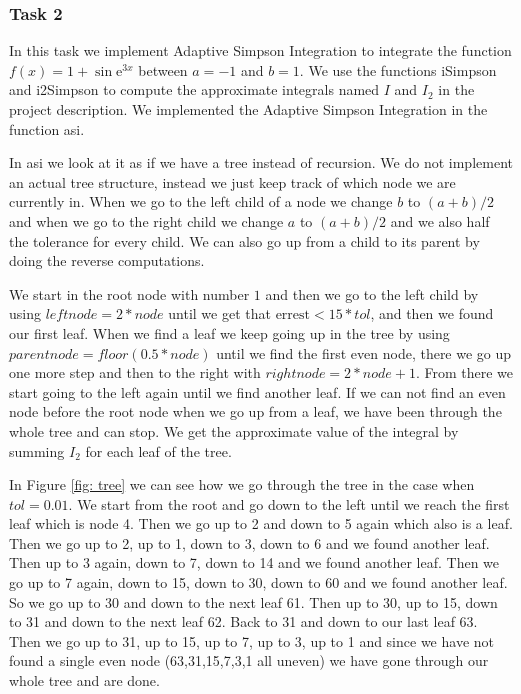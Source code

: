 \documentclass[a4paper,10pt]{article}
\newcommand{\e}{\text{e}}
\begin{document}
\subsubsection*{Task 2}
In this task we implement Adaptive Simpson Integration to integrate the function $f(x) = 1 + \sin \e ^{3x}$ between $a=-1$ and $b=1$. We use the functions iSimpson and i2Simpson to compute the approximate integrals named $I$ and $I_2$ in the project description. We implemented the Adaptive Simpson Integration in the function asi.

In asi we look at it as if we have a tree instead of recursion. We do not implement an actual tree structure, instead we just keep track of which node we are currently in. When we go to the left child of a node we change $b$ to $(a+b)/2$ and when we go to the right child we change $a$ to $(a+b)/2$ and we also half the tolerance for every child. We can also go up from a child to its parent by doing the reverse computations.

We start in the root node with number $1$ and then we go to the left child by using $leftnode = 2*node$ until we get that $\text{errest}<15*tol$, and then we found our first leaf. When we find a leaf we keep going up in the tree by using $parentnode = floor(0.5 * node)$ until we find the first even node, there we go up one more step and then to the right with $rightnode = 2*node+1$. From there we start going to the left again until we find another leaf. If we can not find an even node before the root node when we go up from a leaf, we have been through the whole tree and can stop. We get the approximate value of the integral by summing $I_2$ for each leaf of the tree.

In Figure \ref{fig: tree} we can see how we go through the tree in the case when $tol=0.01$. We start from the root and go down to the left until we reach the first leaf which is node 4. Then we go up to 2 and down to 5 again which also is a leaf. Then we go up to 2, up to 1, down to 3, down to 6 and we found another leaf. Then up to 3 again, down to 7, down to 14 and we found another leaf. Then we go up to 7 again, down to 15, down to 30, down to 60 and we found another leaf. So we go up to 30 and down to the next leaf 61. Then up to 30, up to 15, down to 31 and down to the next leaf 62. Back to 31 and down to our last leaf 63. Then we go up to 31, up to 15, up to 7, up to 3, up to 1 and since we have not found a single even node (63,31,15,7,3,1 all uneven) we have gone through our whole tree and are done.
\end{document}
